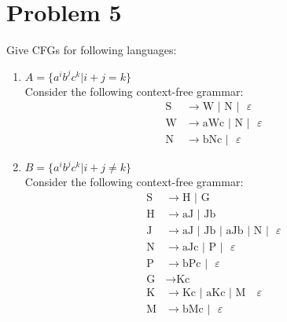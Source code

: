 \documentclass{article}
\begin{document}
\section*{Problem 5}
Give CFGs for following languages: 
  \begin{enumerate}
   \item $A=\{a^i b^j c^k | i+j=k\}$\\
      Consider the following context-free grammar:\\
      \begin{align*}
       \text{S} &\rightarrow \text{W }|\text{ N }|\text{ }\varepsilon\\
       \text{W} &\rightarrow \text{aWc }|\text{ N }|\text{ }\varepsilon\\
       \text{N} &\rightarrow \text{bNc }|\text{ }\varepsilon
      \end{align*}
   \item $B=\{a^i b^j c^k | i+j\not=k\}$\\
      Consider the following context-free grammar:\\
      \begin{align*}
       \text{S} &\rightarrow \text{H }|\text{ G}\\
       \text{H} &\rightarrow \text{aJ }|\text{ Jb}\\
       \text{J} &\rightarrow \text{aJ }|\text{ Jb }|\text{ aJb }|\text{ N }|\text{ }\varepsilon\\
       \text{N} &\rightarrow \text{aJc }|\text{ P }|\text{ }\varepsilon\\
       \text{P} &\rightarrow \text{bPc }|\text{ }\varepsilon\\
       \text{G} &\rightarrow \text{Kc}\\
       \text{K} &\rightarrow \text{Kc }|\text{ aKc }|\text{ M }\text{ }\varepsilon\\
       \text{M} &\rightarrow \text{bMc }|\text{ }\varepsilon
      \end{align*}

  \end{enumerate}
\end{document}
